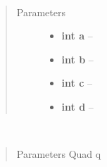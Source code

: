 \documentclass[letterpaper,10pt,english]{sphinxmanual}
\begin{document}
\begin{fulllineitems}
\label{gl:VertexData::addQuad__i.i.i.i}~\begin{quote}\begin{description}
\item[{Parameters}] \leavevmode\begin{itemize}
\item {} 
\textbf{int a} -- 

\item {} 
\textbf{int b} -- 

\item {} 
\textbf{int c} -- 

\item {} 
\textbf{int d} -- 

\end{itemize}

\end{description}\end{quote}

\end{fulllineitems}


\begin{fulllineitems}
\label{gl:VertexData::addQuad__Quad}~\begin{quote}\begin{description}
\item[{Parameters Quad q}] \leavevmode


\end{description}\end{quote}

\end{fulllineitems}

\end{document}
